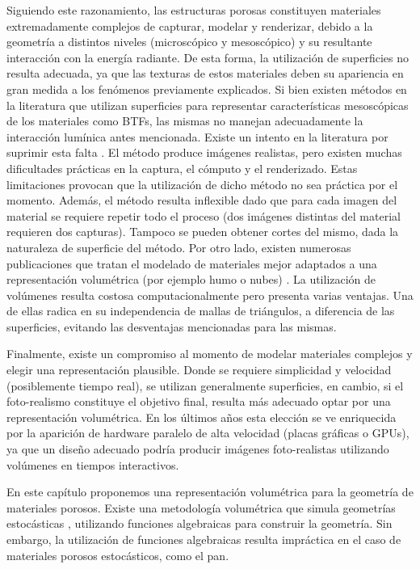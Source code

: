 Siguiendo este razonamiento, las estructuras porosas constituyen materiales extremadamente complejos de capturar, modelar y renderizar, debido a la geometría a distintos niveles (microscópico y mesoscópico) y su resultante interacción con la energía radiante.
De esta forma, la utilización de superficies no resulta adecuada, ya que las texturas de estos materiales deben su apariencia en gran medida a los fenómenos previamente explicados.
Si bien existen métodos en la literatura que utilizan superficies para representar características mesoscópicas de los materiales como BTFs, las mismas no manejan adecuadamente la interacción lumínica antes mencionada.
Existe un intento en la literatura por suprimir esta falta \cite{Tong2005}.
El método produce imágenes realistas, pero existen muchas dificultades prácticas en la captura, el cómputo y el renderizado.
Estas limitaciones provocan que la utilización de dicho método no sea práctica por el momento.
Además, el método resulta inflexible dado que para cada imagen del material se requiere repetir todo el proceso (dos imágenes distintas del material requieren dos capturas).
Tampoco se pueden obtener cortes del mismo, dada la naturaleza de superficie del método.
Por otro lado, existen numerosas publicaciones que tratan el modelado de materiales mejor adaptados a una representación volumétrica (por ejemplo humo o nubes) \cite{Chentanez2011,Zhou2008}.
La utilización de volúmenes resulta costosa computacionalmente pero presenta varias ventajas.
Una de ellas radica en su independencia de mallas de triángulos, a diferencia de las superficies, evitando las desventajas mencionadas para las mismas.

Finalmente, existe un compromiso al momento de modelar materiales complejos y elegir una representación plausible.
Donde se requiere simplicidad y velocidad (posiblemente tiempo real), se utilizan generalmente superficies, en cambio, si el foto-realismo constituye el objetivo final, resulta más adecuado optar por una representación volumétrica.
En los últimos años esta elección se ve enriquecida por la aparición de hardware paralelo de alta velocidad (placas gráficas o GPUs), ya que un diseño adecuado podría producir imágenes foto-realistas utilizando volúmenes en tiempos interactivos.

En este capítulo proponemos una representación volumétrica para la geometría de materiales porosos.
Existe una metodología volumétrica que simula geometrías estocásticas \cite{Perlin1989}, utilizando funciones algebraicas para construir la geometría.
Sin embargo, la utilización de funciones algebraicas resulta impráctica en el caso de materiales porosos estocásticos, como el pan.

